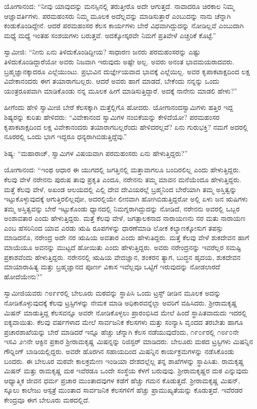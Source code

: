  ಯೋಗಾನಂದ: “ನೀವು ಯಾವುದನ್ನು ಮನಸ್ಸಿನಲ್ಲಿ ತರುತ್ತೀರೊ ಅದೇ ಆಗುತ್ತದೆ. ನಾವಾದರೂ ಚಿರಕಾಲ ನಿಮ್ಮ ಆಜ್ಞಾವರ್ತಿಗಳು. ಪರಮಹಂಸರು ನಿಮ್ಮ ಮೂಲಕ ಅದೆಲ್ಲವನ್ನು ಮಾಡಿಸುತ್ತಾರೆ ಎಂಬುದನ್ನು ನಾನು ಚೆನ್ನಾಗಿ ಕಂಡುಕೊಂಡಿದ್ದೇನೆ. ಆದರೆ ಪರಮಹಂಸರ ಕೆಲಸ ಕಾರ್ಯಗಳು ಬೇರೆ ವಿಧವಾಗಿದ್ದುದನ್ನು ನೋಡಿಲ್ಲವೆ ಎಂಬುದಾಗಿ ಮಧ್ಯೆ ಮಧ್ಯೆ ಇಂತಹ ಸಂಶಯಗಳು ಬರುತ್ತವೆ. ಅದಕ್ಕೋಸ್ಕರವೇ ನಿಮಗೆ ಪ್ರತಿವೇಳೆ ಎಚ್ಚರಿಕೆ ಕೊಟ್ಟೆ.” 

 ಸ್ವಾಮೀಜಿ: “ನೀನು ಏನು ತಿಳಿದುಕೊಂಡಿದ್ದೀಯ? ಸಾಧಾರಣ ಜನರು ಪರಮಹಂಸರನ್ನು ಎಷ್ಟು ತಿಳಿದುಕೊಂಡಿದ್ದಾರೆಯೋ ಅವರು ನಿಜವಾಗಿ ಇರುವುದು ಅಷ್ಟೇ ಅಲ್ಲ. ಅವರು ಅನಂತ ಭಾವಮಯರಾದವರು. ಬ್ರಹ್ಮಜ್ಞಾನಕ್ಕಾದರೂ ಎಲ್ಲೆಯುಂಟು. ಪ್ರಭುವಿನ ದುರ್ಜ್ಞೇಯವಾದ ಭಾವಕ್ಕೆ ಎಲ್ಲೆಯಿಲ್ಲ. ಅವರ ಕೃಪಾಕಟಾಕ್ಷದಿಂದ ಲಕ್ಷ ವಿವೇಕಾನಂದರು ಈಗ ತಯಾರಾಗಬಲ್ಲರು. ಆದರೆ ಅವರು ಹಾಗೆ ಮಾಡದೆ, ಬೇಕೆಂದು ನನ್ನನ್ನು ಒಂದು ಯಂತ್ರರೂಪವಾಗಿ ಮಾಡಿಕೊಂಡು ನನ್ನ ಮೂಲಕ ಹೀಗೆ ಮಾಡಿಸುತ್ತಿದ್ದಾರೆ. ಅದಕ್ಕೆ ನಾನೇನು ಮಾಡಲಿ ಹೇಳು?” 

 ಹೀಗೆಂದು ಹೇಳಿ ಸ್ವಾಮೀಜಿ ಬೇರೆ ಕೆಲಸಕ್ಕಾಗಿ ಮತ್ತೆಲ್ಲಿಗೊ ಹೋದರು. ಯೋಗಾನಂದಸ್ವಾಮಿಗಳು ಹತ್ತಿರ ಇದ್ದ ಶಿಷ್ಯರನ್ನು ಕುರಿತು ಹೇಳಿದರು: “ವಿವೇಕಾನಂದ ಸ್ವಾಮಿಗಳ ನಂಬಿಕೆಯನ್ನು ಕೇಳಿದೆಯೋ? ಪರಮಹಂಸರ ಕೃಪಾಕಟಾಕ್ಷದಿಂದ ಲಕ್ಷ ವಿವೇಕಾನಂದರು ತಯಾರಾಗಬಲ್ಲರೆಂದು ಹೇಳಿದರಲ್ಲವೆ? ಏನು ಗುರುಭಕ್ತಿ? ನಮಗೆ ಅದರಲ್ಲಿ ನೂರರಲ್ಲಿ ಒಂದು ಭಾಗ ಇದ್ದರೂ ಧನ್ಯರಾಗಿಬಿಡುತ್ತಿದ್ದೆವು.” 

 ಶಿಷ್ಯ: “ಮಹಾರಾಜ್, ಸ್ವಾಮಿಗಳ ವಿಷಯವಾಗಿ ಪರಮಹಂಸರು ಏನು ಹೇಳುತ್ತಿದ್ದರು?” 

 ಯೋಗಾನಂದ: “ಇಂಥ ಆಧಾರ ಈ ಯುಗದಲ್ಲಿ ಜಗತ್ತಿನಲ್ಲಿ ಮತ್ತಾವಾಗಲೂ ಬಂದಿರಲಿಲ್ಲ ಎಂದು ಹೇಳುತ್ತಿದ್ದರು. ಕೆಲವು ವೇಳೆ ನರೇನನು ಪುರುಷ ತಾವು ಪ್ರಕೃತಿ ಎಂದೂ, ನರೇನನು ತಮ್ಮ ಮಾವನ ಮನೆಯೆಂದೂ ಹೇಳುತ್ತಿದ್ದರು. ಮತ್ತೆ ಕೆಲವು ವೇಳೆ, ಅಖಂಡ ಆಲಯದಲ್ಲಿ ಎಲ್ಲಿ ದೇವ ದೇವಿಯರಲ್ಲೆ ಬ್ರಹ್ಮನಿಂದ ಬೇರೆಯಾಗಿ ತಮ್ಮ ಅಸ್ತಿತ್ವನ್ನು ಇಟ್ಟುಕೊಳ್ಳುವುದಕ್ಕೆ ಆಗುತ್ತಿರಲಿಲ್ಲವೋ, ಅದರಲ್ಲಿಯೇ ಲೀನವಾಗಿ ಹೋಗಿಬಿಡುತ್ತಿದ್ದರೋ ಅಲ್ಲಿ ಏಳು ಜನ ಋಷಿಗಳು ತಮ್ಮ ಅಸ್ತಿತ್ವವನ್ನು ಬೇರೆ ಇಟ್ಟುಕೊಂಡು ಧ್ಯಾನದಲ್ಲಿ ನಿಮಗ್ನರಾಗಿದ್ದುದನ್ನು ನೋಡಿದೆ, ನರೇನನು ಅವರಲ್ಲಿ ಒಬ್ಬರ ಅಂಶಾವತಾರ ಎಂದು ಹೇಳುತ್ತಿದ್ದರು. ಮತ್ತೆ ಕೆಲವು ವೇಳೆ, ಜಗತ್ಪಾಲಕನಾದ ನಾರಾಯಣನು ನರ ಮತು ನಾರಾಯಣ ಎಂಬ ಹೆಸರಿನಿಂದ ಯಾವ ಎರಡು ಋಷಿ ರೂಪಗಳನ್ನು ಧಾರಣೆಮಾಡಿ ಲೋಕ ಕಲ್ಯಾಣಕ್ಕೋಸುಗ ತಪಸ್ಸು ಮಾಡಿದನೊ, ನರೇಂದ್ರ ಅದೇ ನರ ಋಷಿಯ ಅವತಾರ ಎಂದು ಹೇಳುತಿದ್ದರು. ಮತ್ತೆ ಕೆಲವು ವೇಳೆ ಶುಕದೇವನ ಹಾಗೆ ಮಾಯೆಯೂ ಅವನನ್ನು ಮುಟ್ಟದೆ ಹೋಯಿತು ಎಂದು ಹೇಳುತ್ತಿದ್ದರು. ಅವರು ನರೇಂದ್ರನನ್ನು ಇವರೆಲ್ಲರ ಸಮಷ್ಟಿ ಪ್ರಕಾಶವೆಂದು ಹೇಳುತ್ತಿದ್ದರು. ನರೇನನಲ್ಲಿ ಋಷಿಯ ವೇದಜ್ಞಾನ, ಶಂಕರನ ತ್ಯಾಗ, ಬುದ್ಧನ ಹೃದಯ, ಶುಕದೇವನ ಮಾಯಾರಾಹಿತ್ಯ ಮತ್ತು ಬ್ರಹ್ಮಜ್ಞಾನದ ಪೂರ್ಣ ವಿಕಾಸ ಇವೆಲ್ಲವೂ ಒಟ್ಟಿಗೆ ಇರುವುದನ್ನು ನೋಡಲಾರದೆ ಹೋದೆಯೇನು?” 

 ಸ್ವಾಮೀಜಿಯವರು ೧೮೯೯ರಲ್ಲಿ ಬೇಲೂರು ಮಠವನ್ನು ಸ್ಥಾಪಿಸಿ ಒಂದು ಟ್ರಸ್ಟ್ ಡೀಡಿನ ಮೂಲಕ ಅದನ್ನು ನೋಡಿಕೊಳ್ಳುವುದಕ್ಕೆ ಕೆಲವು ಟ್ರಸ್ಟಿಗಳನ್ನು ನೇಮಕ ಮಾಡಿ ಅಧಿಕಾರವನ್ನೆಲ್ಲಾ ಅವರಿಗೆ ವಹಿಸಿದರು. ಶ‍್ರೀರಾಮಕೃಷ್ಣ ಮಿಷನ್ ಮಾಡುತ್ತಿದ್ದ ಕೆಲಸವನ್ನೂ ಅವರೇ ನೋಡಿಕೊಳ್ಳಲು ಪ್ರಾರಂಭಿಸಿದ ಮೇಲೆ ಹಿಂದೆ ಸ್ಥಾಪಿತವಾದುದು ಇದರಲ್ಲಿ ಐಕ್ಯವಾಯಿತು. ಕೆಲವು ವರ್ಷಗಳಾದ ಮೇಲೆ ಸಾರ್ವಜನಿಕ ಕೆಲಸಗಳು ಮತ್ತು ಸಂನ್ಯಾಸಿ ವೃಂದದ ತರಬೇತು ಹಾಗೂ ಪ್ರಚಾರಶಾಖೆಯನ್ನು ಬೇರೆ ಮಾಡಿದರೆ ಇನ್ನೂ ಹೆಚ್ಚು ಚೆನ್ನಾಗಿ ಕೆಲಸ ನಡೆಯುವುದೆಂದು, ೧೯೦೯ರಲ್ಲಿ ೧೮೯೦ನೇ ಇಸವಿ ೨೧ನೇ ಆಕ್ಟಿನ ಪ್ರಕಾರ ಶ‍್ರೀರಾಮಕೃಷ್ಣ ಮಿಷನ್ನನ್ನು ರಿಜಿಸ್ಟರ್ ಮಾಡಿದರು. ಬೇಲೂರು ಮಠದ ಟ್ರಸ್ಟಿಗಳು ಮಿಷನ್ನಿನ ಗೌರ‍್ನಿಂಗ್ ಬಾಡಿಯಲ್ಲಿದ್ದರು. ಅವರೇ ಹೊರಗಿನ ಸಹಾಯದಿಂದ ಮಿಷನ್ನಿನ ಕಾರ್ಯಕ್ರಮಗಳನ್ನು ನಡೆಸಿಕೊಂಡು ಬಂದರು. ಈ ಬೇಲೂರ ಮಠವೇ ಕಾಲಕ್ರಮೇಣ ಇಂಡಿಯಾ ದೇಶದಲ್ಲೆಲ್ಲ ತನ್ನ ಶಾಖೆಗಳನ್ನು ಸ್ಥಾಪಿಸಿತು. ರಾಮಕೃಷ್ಣ ಮಿಷನ್ ಮತ್ತು ರಾಮಕೃಷ್ಣ ಮಠ ಇವೆರಡೂ ಒಂದೇ ಸಂಸ್ಥೆಯ ಕೆಳಗೆ ಬರುವುವು. ಶ‍್ರೀರಾಮಕೃಷ್ಣರ ಮಠ ಎನ್ನುವುದು ಆಧ್ಯಾತ್ಮಿಕ ಜೀವನ ಧರ್ಮ ಪ್ರಚಾರ ಮುಂತಾದವುಗಳ ಕಡೆಗೆ ಹೆಚ್ಚು ಗಮನ ಕೊಡುತ್ತದೆ. ಶ‍್ರೀರಾಮಕೃಷ್ಣ ಮಿಷನ್, ಸ್ಕೂಲು ಕಾಲೇಜು ಆಸ್ಪತ್ರೆ ಮುಂತಾದ ಸಾರ್ವಜನಿಕ ಕೆಲಸಗಳಿಗೆ ಹೆಚ್ಚು ಪ್ರಾಮುಖ್ಯತೆಯನ್ನು ಕೊಡುತ್ತದೆ. ಇವೆರಡರ ಕೇಂದ್ರವೂ ಈಗ ಬೇಲೂರು ಮಠದಲ್ಲಿದೆ. 

